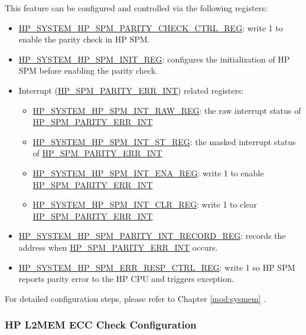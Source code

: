 \documentclass[main\_\_EN.tex]{subfiles}
\begin{document}
This feature can be configured and controlled via the following registers:
\begin{itemize}
    \item \hyperref[regdesc:HPSYSTEMHPSPMPARITYCHECKCTRLREG]{HP\_SYSTEM\_HP\_SPM\_PARITY\_CHECK\_CTRL\_REG}: write 1 to enable the parity check in HP SPM.
    \item \hyperref[regdesc:HPSYSTEMHPSPMINITREG]{HP\_SYSTEM\_HP\_SPM\_INIT\_REG}: configures the initialization of HP SPM before enabling the parity check.
    \item Interrupt (\hyperref[tab:sysreg-int-sources]{HP\_SPM\_PARITY\_ERR\_INT}) related registers:
    \begin{itemize}
        \item \hyperref[regdesc:HPSYSTEMHPSPMINTRAWREG]{HP\_SYSTEM\_HP\_SPM\_INT\_RAW\_REG}: the raw interrupt status of \hyperref[tab:sysreg-int-sources]{HP\_SPM\_PARITY\_ERR\_INT}
        \item \hyperref[regdesc:HPSYSTEMHPSPMINTSTREG]{HP\_SYSTEM\_HP\_SPM\_INT\_ST\_REG}: the masked interrupt status of \hyperref[tab:sysreg-int-sources]{HP\_SPM\_PARITY\_ERR\_INT}
        \item \hyperref[regdesc:HPSYSTEMHPSPMINTENAREG]{HP\_SYSTEM\_HP\_SPM\_INT\_ENA\_REG}: write 1 to enable \hyperref[tab:sysreg-int-sources]{HP\_SPM\_PARITY\_ERR\_INT}
        \item \hyperref[regdesc:HPSYSTEMHPSPMINTCLRREG]{HP\_SYSTEM\_HP\_SPM\_INT\_CLR\_REG}: write 1 to clear \hyperref[tab:sysreg-int-sources]{HP\_SPM\_PARITY\_ERR\_INT}
    \end{itemize}
    \item \hyperref[regdesc:HPSYSTEMHPSPMPARITYINTRECORDREG]{HP\_SYSTEM\_HP\_SPM\_PARITY\_INT\_RECORD\_REG}: records the address when \hyperref[tab:sysreg-int-sources]{HP\_SPM\_PARITY\_ERR\_INT} occurs.
    \item \hyperref[regdesc:HPSYSTEMHPSPMERRRESPCTRLREG]{HP\_SYSTEM\_HP\_SPM\_ERR\_RESP\_CTRL\_REG}: write 1 so HP SPM reports parity error to the HP CPU and triggers exception.
\end{itemize}

For detailed configuration steps, please refer to Chapter \ref{mod:sysmem} \textit{}.


\subsubsection{HP L2MEM ECC Check Configuration}
\end{document}
